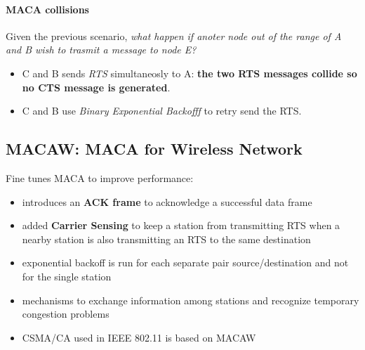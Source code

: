 \documentclass[10pt,a4paper]{report}
\theoremstyle{definition}
\begin{document}
\paragraph{MACA collisions}\label{sec:maca-collisions}
Given the previous scenario, \textit{what happen if anoter node out of the range of A and B wish to trasmit a message to node E?}
\begin{itemize}
	\item 
	C and B sends \textit{RTS} simultaneosly to A: \textbf{the two RTS messages collide so no CTS message is generated}.
	\item 
	C and B use \textit{Binary Exponential Backofff} to retry send the RTS.
\end{itemize}
\subsection{MACAW: MACA for Wireless Network}\label{sec:macaw-maca-for-wireless-network}
Fine tunes MACA to improve performance:
\begin{itemize}
	\item 
	introduces an \textbf{ACK frame} to acknowledge a successful data frame
	\item 
	added \textbf{Carrier Sensing} to keep a station from transmitting RTS when a nearby station is also transmitting an RTS to the same destination
	\item 
	exponential backoff is run for each separate pair source/destination and not for the single station
	\item 
	mechanisms to exchange information among stations and recognize temporary congestion problems
	\item 
	CSMA/CA used in IEEE 802.11 is based on MACAW
\end{itemize}
\end{document}
